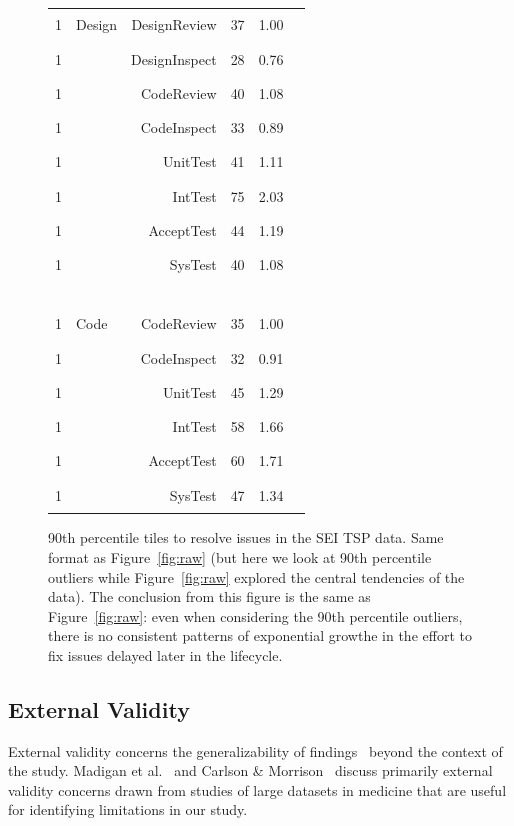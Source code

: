 \documentclass[smallcondensed]{svjour3}
\newcommand{\fig}[1]{Figure~\ref{fig:#1}}
\begin{document}
\begin{figure}[!t]
\begin{center}
\begin{tabular}{c|lr|r|rl}
1 & Design   &   DesignReview     & 37 &   1.00 & \textcolor{black}{\rule{10mm}{2mm}}\\
1 &          &   DesignInspect    & 28 &    0.76 & \textcolor{black}{\rule{7mm}{2mm}}\\
1 &   &   CodeReview        & 40 &     1.08 & \textcolor{black}{\rule{10mm}{2mm}}\\
1 &   &   CodeInspect      & 33 &     0.89 & \textcolor{black}{\rule{8mm}{2mm}}\\
1 &   &   UnitTest          & 41 &     1.11 & \textcolor{black}{\rule{12mm}{2mm}}\\
1 &   &   IntTest          & 75 &    2.03 & \textcolor{black}{\rule{20mm}{2mm}}\\
1 &   &   AcceptTest       & 44 &     1.19 & \textcolor{black}{\rule{12mm}{2mm}}\\
1 &   &   SysTest           & 40 &     1.08 & \textcolor{black}{\rule{10mm}{2mm}}\\
\hline\multicolumn{6}{c}{~}  \\
1 &  Code   &   CodeReview      & 35    & 1.00 & \textcolor{black}{\rule{10mm}{2mm}}\\
1 &    &   CodeInspect    & 32   & 0.91 & \textcolor{black}{\rule{9mm}{2mm}}\\
1 &   &   UnitTest      & 45  & 1.29 & \textcolor{black}{\rule{12mm}{2mm}}\\
1 &    &   IntTest         & 58   & 1.66 & \textcolor{black}{\rule{16mm}{2mm}}\\
1 &    &   AcceptTest      & 60 &   1.71 & \textcolor{black}{\rule{17mm}{2mm}}\\
1 &   &   SysTest        & 47 &    1.34 & \textcolor{black}{\rule{13mm}{2mm}}\\

\end{tabular}
\end{center}
\caption{90th percentile tiles to resolve issues in the SEI TSP data. Same format as \fig{raw} (but here we look at 90th percentile
outliers while   \fig{raw} explored the central tendencies of the data). The conclusion from this figure is the same
as \fig{raw}: even when considering the 90th percentile outliers, there is no consistent patterns of 
exponential growthe in the effort to fix issues delayed later in the lifecycle.}\label{fig:last}
\end{figure}

\subsection{External Validity}
\label{sect:external_validity}
External validity concerns the generalizability of findings~\cite{wohlin2012} beyond the context of the study. Madigan et al.~\cite{madigan2014} and Carlson \& Morrison~\cite{carlson2009} discuss primarily external validity concerns drawn from studies of large datasets in medicine that are useful for identifying limitations in our study.
\end{document}
